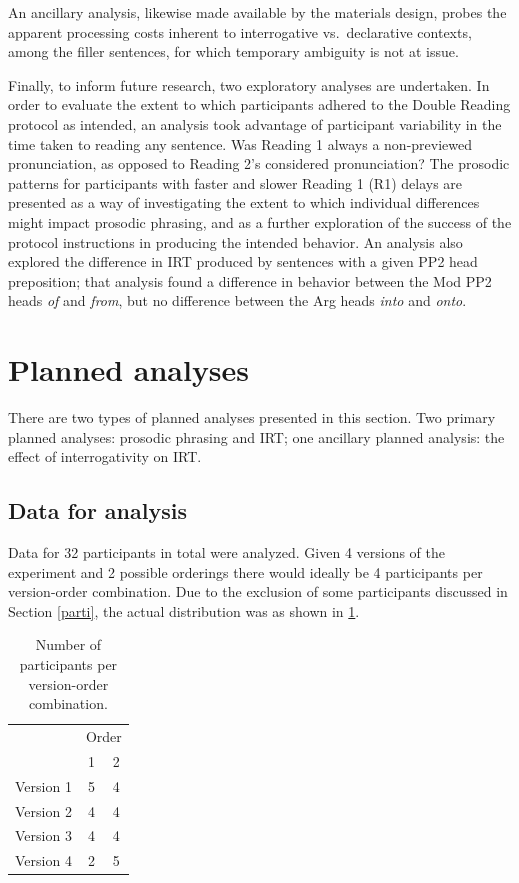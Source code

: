\documentclass[11pt,oneside]{book}
\begin{document}
An ancillary analysis, likewise made available by the materials design, probes the apparent processing costs inherent to interrogative vs.~declarative contexts, among the filler sentences, for which temporary ambiguity is not at issue.

Finally, to inform future research, two exploratory analyses are undertaken. In order to evaluate the extent to which participants adhered to the Double Reading protocol as intended, an analysis took advantage of participant variability in the time taken to reading any sentence. Was Reading 1 always a non-previewed pronunciation, as opposed to Reading 2's considered pronunciation? The prosodic patterns for participants with faster and slower Reading 1 (R1) delays are presented as a way of investigating the extent to which individual differences might impact prosodic phrasing, and as a further exploration of the success of the protocol instructions in producing the intended behavior. An analysis also explored the difference in IRT produced by sentences with a given PP2 head preposition; that analysis found a difference in behavior between the Mod PP2 heads \emph{of} and \emph{from}, but no difference between the Arg heads \emph{into} and \emph{onto}.

\hypertarget{planned-analyses}{%
\section{Planned analyses}\label{planned-analyses}}

There are two types of planned analyses presented in this section. Two primary planned analyses: prosodic phrasing and IRT; one ancillary planned analysis: the effect of interrogativity on IRT.

\hypertarget{data}{%
\subsection{Data for analysis}\label{data}}

Data for 32 participants in total were analyzed. Given 4 versions of the experiment and 2 possible orderings there would ideally be 4 participants per version-order combination. Due to the exclusion of some participants discussed in Section \ref{parti}, the actual distribution was as shown in \ref{tab:vtab}.

\begin{table}[!h]

\caption{\label{tab:vtab}Number of participants per version-order combination.}
\centering
\begin{tabular}{lcc}
\toprule
\multicolumn{1}{c}{ } & \multicolumn{2}{c}{Order} \\
\cmidrule(l{3pt}r{3pt}){2-3}
  & 1 & 2\\
\midrule
Version 1 & 5 & 4\\
Version 2 & 4 & 4\\
Version 3 & 4 & 4\\
Version 4 & 2 & 5\\
\bottomrule
\end{tabular}
\end{table}
\end{document}
